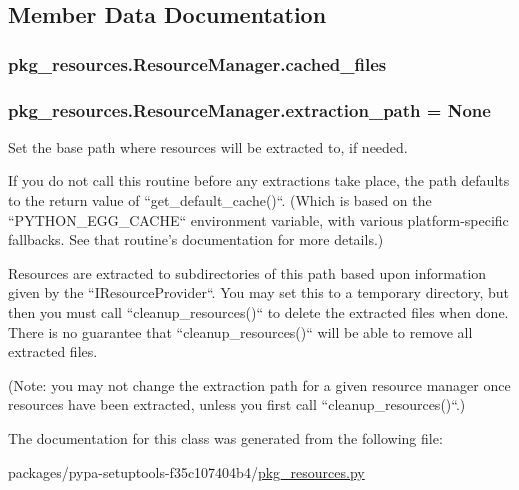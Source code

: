 \subsection{Member Data Documentation}
\hypertarget{classpkg__resources_1_1ResourceManager_a73e8a505d671a5662efa4f9213a32c32}{}
\subsubsection[{cached\+\_\+files}]{\setlength{\rightskip}{0pt plus 5cm}pkg\+\_\+resources.\+Resource\+Manager.\+cached\+\_\+files}\label{classpkg__resources_1_1ResourceManager_a73e8a505d671a5662efa4f9213a32c32}
\hypertarget{classpkg__resources_1_1ResourceManager_a6120904625d6624b7ecae0f9175ea9dd}{}
\subsubsection[{extraction\+\_\+path}]{\setlength{\rightskip}{0pt plus 5cm}pkg\+\_\+resources.\+Resource\+Manager.\+extraction\+\_\+path = None\hspace{0.3cm}{\ttfamily [static]}}\label{classpkg__resources_1_1ResourceManager_a6120904625d6624b7ecae0f9175ea9dd}
\begin{DoxyVerb}Set the base path where resources will be extracted to, if needed.

If you do not call this routine before any extractions take place, the
path defaults to the return value of ``get_default_cache()``.  (Which
is based on the ``PYTHON_EGG_CACHE`` environment variable, with various
platform-specific fallbacks.  See that routine's documentation for more
details.)

Resources are extracted to subdirectories of this path based upon
information given by the ``IResourceProvider``.  You may set this to a
temporary directory, but then you must call ``cleanup_resources()`` to
delete the extracted files when done.  There is no guarantee that
``cleanup_resources()`` will be able to remove all extracted files.

(Note: you may not change the extraction path for a given resource
manager once resources have been extracted, unless you first call
``cleanup_resources()``.)
\end{DoxyVerb}
 

The documentation for this class was generated from the following file\+:\begin{DoxyCompactItemize}
\item 
packages/pypa-\/setuptools-\/f35c107404b4/\hyperlink{pkg__resources_8py}{pkg\+\_\+resources.\+py}\end{DoxyCompactItemize}
